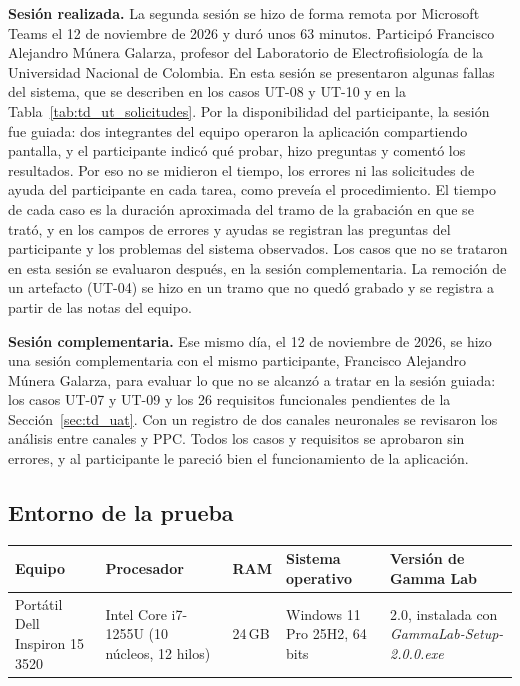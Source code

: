 \documentclass[12pt,letterpaper,oneside]{article}
\DeclareRobustCommand{\_}{\textunderscore\allowbreak}
\newcommand{\fechasesion}{12 de noviembre de 2026}
\newcommand{\fechasesionmunera}{12 de noviembre de 2026}
\begin{document}
\textbf{Sesión realizada.} La segunda sesión se hizo de forma remota por Microsoft Teams el \fechasesion{} y duró unos 63 minutos. Participó Francisco Alejandro Múnera Galarza, profesor del Laboratorio de Electrofisiología de la Universidad Nacional de Colombia. En esta sesión se presentaron algunas fallas del sistema, que se describen en los casos UT-08 y UT-10 y en la Tabla~\ref{tab:td_ut_solicitudes}. Por la disponibilidad del participante, la sesión fue guiada: dos integrantes del equipo operaron la aplicación compartiendo pantalla, y el participante indicó qué probar, hizo preguntas y comentó los resultados. Por eso no se midieron el tiempo, los errores ni las solicitudes de ayuda del participante en cada tarea, como preveía el procedimiento. El tiempo de cada caso es la duración aproximada del tramo de la grabación en que se trató, y en los campos de errores y ayudas se registran las preguntas del participante y los problemas del sistema observados. Los casos que no se trataron en esta sesión se evaluaron después, en la sesión complementaria. La remoción de un artefacto (UT-04) se hizo en un tramo que no quedó grabado y se registra a partir de las notas del equipo.

\textbf{Sesión complementaria.} Ese mismo día, el \fechasesionmunera{}, se hizo una sesión complementaria con el mismo participante, Francisco Alejandro Múnera Galarza, para evaluar lo que no se alcanzó a tratar en la sesión guiada: los casos UT-07 y UT-09 y los 26 requisitos funcionales pendientes de la Sección~\ref{sec:td_uat}. Con un registro de dos canales neuronales se revisaron los análisis entre canales y PPC. Todos los casos y requisitos se aprobaron sin errores, y al participante le pareció bien el funcionamiento de la aplicación.

\subsection{Entorno de la prueba}

\begin{center}
\small
\begin{tabularx}{\textwidth}{|X|X|X|X|X|}
\hline
\textbf{Equipo} & \textbf{Procesador} & \textbf{RAM} & \textbf{Sistema operativo} & \textbf{Versión de Gamma Lab} \\
\hline
Portátil Dell Inspiron 15 3520 & Intel Core i7-1255U (10 núcleos, 12 hilos) & 24\,GB & Windows 11 Pro 25H2, 64 bits & 2.0, instalada con \textit{GammaLab-Setup-2.0.0.exe} \\
\hline
\end{tabularx}
\label{tab:td_ut_entorno}
\end{center}
\end{document}
